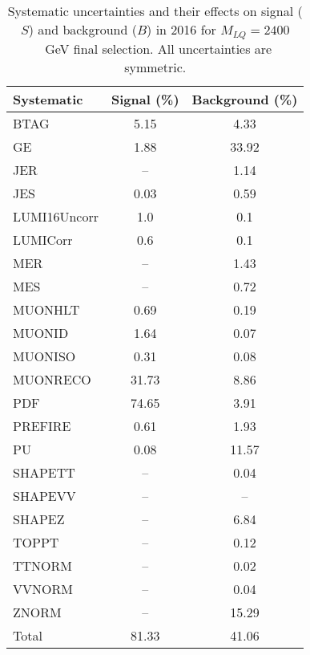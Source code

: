 \begin{table}[htbp]
\begin{center}
\caption{Systematic uncertainties and their effects on signal ($S$) and background ($B$) in 2016 for $M_{LQ}=2400$~GeV final selection. All uncertainties are symmetric.}
\begin{tabular}{lcc}
\hline\hline
Systematic & Signal (\%) & Background (\%) \\ \hline 
BTAG & 5.15 & 4.33\\ 
GE & 1.88 & 33.92\\ 
JER & -- & 1.14\\ 
JES & 0.03 & 0.59\\ 
LUMI16Uncorr & 1.0 & 0.1\\ 
LUMICorr & 0.6 & 0.1\\ 
MER & -- & 1.43\\ 
MES & -- & 0.72\\ 
MUONHLT & 0.69 & 0.19\\ 
MUONID & 1.64 & 0.07\\ 
MUONISO & 0.31 & 0.08\\ 
MUONRECO & 31.73 & 8.86\\ 
PDF & 74.65 & 3.91\\ 
PREFIRE & 0.61 & 1.93\\ 
PU & 0.08 & 11.57\\ 
SHAPETT & -- & 0.04\\ 
SHAPEVV & -- & --\\ 
SHAPEZ & -- & 6.84\\ 
TOPPT & -- & 0.12\\ 
TTNORM & -- & 0.02\\ 
VVNORM & -- & 0.04\\ 
ZNORM & -- & 15.29\\ 
Total & 81.33 & 41.06\\ \hline \hline
\end{tabular}
\label{tab:SysUncertainties_uujj_2400}
\end{center}
\end{table}

